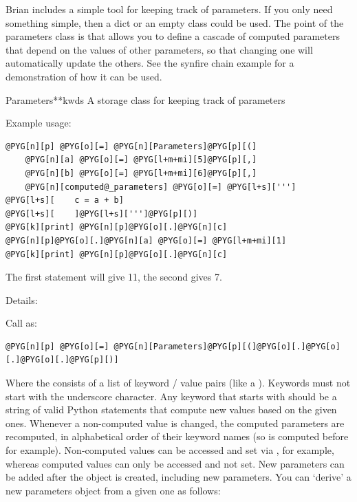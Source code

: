 \documentclass[letterpaper,10pt,english]{manual}
\begin{document}
Brian includes a simple tool for keeping track of parameters. If you only need
something simple, then a dict or an empty class could be used. The point of the
parameters class is that allows you to define a cascade of computed parameters
that depend on the values of other parameters, so that changing one will
automatically update the others. See the synfire chain example
 for a demonstration of how it can be used.

\hypertarget{brian.Parameters}{}\begin{classdesc}{Parameters}{**kwds}
A storage class for keeping track of parameters

Example usage:

\begin{Verbatim}[commandchars=@\[\]]
@PYG[n][p] @PYG[o][=] @PYG[n][Parameters]@PYG[p][(]
    @PYG[n][a] @PYG[o][=] @PYG[l+m+mi][5]@PYG[p][,]
    @PYG[n][b] @PYG[o][=] @PYG[l+m+mi][6]@PYG[p][,]
    @PYG[n][computed@_parameters] @PYG[o][=] @PYG[l+s][''']
@PYG[l+s][    c = a + b]
@PYG[l+s][    ]@PYG[l+s][''']@PYG[p][)]
@PYG[k][print] @PYG[n][p]@PYG[o][.]@PYG[n][c]
@PYG[n][p]@PYG[o][.]@PYG[n][a] @PYG[o][=] @PYG[l+m+mi][1]
@PYG[k][print] @PYG[n][p]@PYG[o][.]@PYG[n][c]
\end{Verbatim}

The first  statement will give 11, the second gives 7.

Details:

Call as:

\begin{Verbatim}[commandchars=@\[\]]
@PYG[n][p] @PYG[o][=] @PYG[n][Parameters]@PYG[p][(]@PYG[o][.]@PYG[o][.]@PYG[o][.]@PYG[p][)]
\end{Verbatim}

Where the  consists of a list of keyword / value pairs (like a ).
Keywords must not start with the underscore \code{\_} character. Any
keyword that starts with  should be a string of valid Python statements
that compute new values based on the given ones. Whenever a non-computed value is
changed, the computed parameters are recomputed, in alphabetical order of their
keyword names (so  is computed before  for example).
Non-computed values can be accessed and set via ,  for example, whereas
computed values can only be accessed and not set. New parameters can be added
after the \hyperlink{brian.Parameters}{} object is created, including new  parameters. You
can `derive' a new parameters object from a given one as follows:


\end{classdesc}
\end{document}
